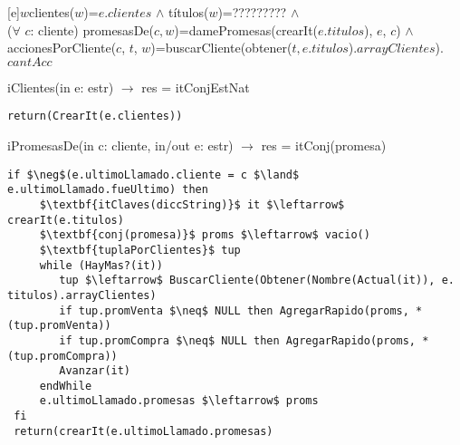   	 [e]{$w$}{clientes($w$)=$e.clientes$ $\land$ t\'itulos($w$)=????????? $\land$ \\($\forall$ $c$: cliente) promesasDe($c, w$)=damePromesas(crearIt($e.titulos$), $e$, $c$) $\land$ \\accionesPorCliente($c$, $t$, $w$)=buscarCliente(obtener($t, e.titulos$).$arrayClientes$).$cantAcc$}


\lstset { %
    showstringspaces=false,
}
iClientes(in e: estr) $\rightarrow$ res = itConjEstNat
\begin{lstlisting}[mathescape]
  return(CrearIt(e.clientes))
\end{lstlisting}


iPromesasDe(in c: cliente, in/out e: estr) $\rightarrow$ res = itConj(promesa)
\begin{lstlisting}[mathescape]
 if $\neg$(e.ultimoLlamado.cliente = c $\land$ e.ultimoLlamado.fueUltimo) then
	 $\textbf{itClaves(diccString)}$ it $\leftarrow$ crearIt(e.titulos)
	 $\textbf{conj(promesa)}$ proms $\leftarrow$ vacio() 
	 $\textbf{tuplaPorClientes}$ tup
	 while (HayMas?(it))
	 	tup $\leftarrow$ BuscarCliente(Obtener(Nombre(Actual(it)), e. titulos).arrayClientes)
	 	if tup.promVenta $\neq$ NULL then AgregarRapido(proms, *(tup.promVenta))
	 	if tup.promCompra $\neq$ NULL then AgregarRapido(proms, *(tup.promCompra))
	 	Avanzar(it)
	 endWhile
	 e.ultimoLlamado.promesas $\leftarrow$ proms
 fi
 return(crearIt(e.ultimoLlamado.promesas)
\end{lstlisting}

